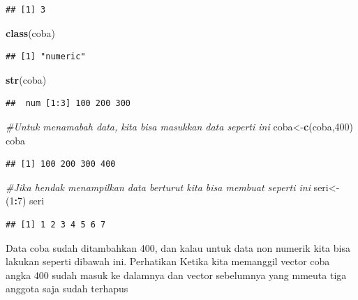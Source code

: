 \documentclass[
]{book}
\newenvironment{Shaded}{\begin{snugshade}}{\end{snugshade}}
\newcommand{\CommentTok}[1]{\textcolor[rgb]{0.56,0.35,0.01}{\textit{#1}}}
\newcommand{\DecValTok}[1]{\textcolor[rgb]{0.00,0.00,0.81}{#1}}
\newcommand{\FunctionTok}[1]{\textcolor[rgb]{0.13,0.29,0.53}{\textbf{#1}}}
\newcommand{\NormalTok}[1]{#1}
\newcommand{\OtherTok}[1]{\textcolor[rgb]{0.56,0.35,0.01}{#1}}
\newcommand{\SpecialCharTok}[1]{\textcolor[rgb]{0.81,0.36,0.00}{\textbf{#1}}}
\theoremstyle{definition}
\theoremstyle{definition}
\theoremstyle{definition}
\theoremstyle{definition}
\theoremstyle{remark}
\begin{document}
\begin{verbatim}
## [1] 3
\end{verbatim}

\begin{Shaded}
\begin{Highlighting}[]
\FunctionTok{class}\NormalTok{(coba)}
\end{Highlighting}
\end{Shaded}

\begin{verbatim}
## [1] "numeric"
\end{verbatim}

\begin{Shaded}
\begin{Highlighting}[]
\FunctionTok{str}\NormalTok{(coba)}
\end{Highlighting}
\end{Shaded}

\begin{verbatim}
##  num [1:3] 100 200 300
\end{verbatim}

\begin{Shaded}
\begin{Highlighting}[]
\CommentTok{\#Untuk menamabah data, kita bisa masukkan data seperti ini }
\NormalTok{coba}\OtherTok{\textless{}{-}}\FunctionTok{c}\NormalTok{(coba,}\DecValTok{400}\NormalTok{)}
\NormalTok{coba}
\end{Highlighting}
\end{Shaded}

\begin{verbatim}
## [1] 100 200 300 400
\end{verbatim}

\begin{Shaded}
\begin{Highlighting}[]
\CommentTok{\#Jika hendak menampilkan data berturut kita bisa membuat seperti ini }
\NormalTok{seri}\OtherTok{\textless{}{-}}\NormalTok{(}\DecValTok{1}\SpecialCharTok{:}\DecValTok{7}\NormalTok{)}
\NormalTok{seri}
\end{Highlighting}
\end{Shaded}

\begin{verbatim}
## [1] 1 2 3 4 5 6 7
\end{verbatim}

Data coba sudah ditambahkan 400, dan kalau untuk data non numerik kita bisa lakukan seperti dibawah ini. Perhatikan Ketika kita memanggil vector coba angka 400 sudah masuk ke dalamnya dan vector sebelumnya yang mmeuta tiga anggota saja sudah terhapus
\end{document}
